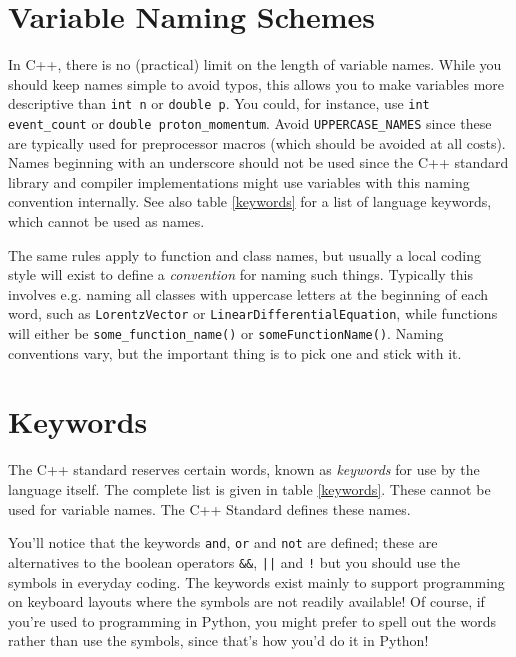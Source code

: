 \documentclass[a4paper]{scrartcl}
\begin{document}
\section{Variable Naming Schemes}
In C++, there is no (practical) limit on the length of variable names. While you should keep names simple to avoid typos, this allows you to make variables more descriptive than \texttt{int n} or \texttt{double p}. You could, for instance, use \texttt{int event\_count} or \texttt{double proton\_momentum}. Avoid \texttt{UPPERCASE\_NAMES} since these are typically used for preprocessor macros (which should be avoided at all costs). Names beginning with an underscore should not be used since the C++ standard library and compiler implementations might use variables with this naming convention internally. See also table \ref{keywords} for a list of language keywords, which cannot be used as names.

The same rules apply to function and class names, but usually a local coding style will exist to define a \emph{convention} for naming such things. Typically this involves e.g. naming all classes with uppercase letters at the beginning of each word, such as \texttt{LorentzVector} or \texttt{LinearDifferentialEquation}, while functions will either be \texttt{some\_function\_name()} or \texttt{someFunctionName()}. Naming conventions vary, but the important thing is to pick one and stick with it.

\section{Keywords}
The C++ standard reserves certain words, known as \emph{keywords} for use by the language itself. The complete list is given in table \ref{keywords}. These cannot be used for variable names. The C++ Standard\cite{C++Standard} defines these names.

You'll notice that the keywords \texttt{and}, \texttt{or} and \texttt{not} are defined; these are alternatives to the boolean operators \texttt{\&\&}, \texttt{||} and \texttt{!} but you should use the symbols in everyday coding. The keywords exist mainly to support programming on keyboard layouts where the symbols are not readily available! Of course, if you're used to programming in Python, you might prefer to spell out the words rather than use the symbols, since that's how you'd do it in Python!
\end{document}
